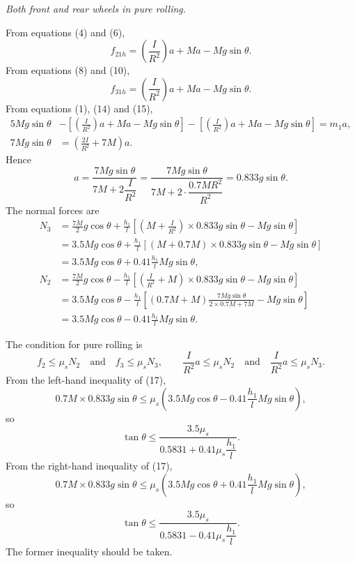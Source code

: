 \emph{Both front and rear wheels in pure rolling.}

From equations (4) and (6),
\begin{equation}
f_{21h}=\left(\frac{I}{R^2}\right)a+Ma-Mg\sin\theta. \tag{14}
\end{equation}
From equations (8) and (10),
\begin{equation}
f_{31h}=\left(\frac{I}{R^2}\right)a+Ma-Mg\sin\theta. \tag{15}
\end{equation}
From equations (1), (14) and (15),
\begin{align*}
5Mg\sin\theta&-\left[\left(\frac{I}{R^2}\right)a+Ma-Mg\sin\theta\right]
-\left[\left(\frac{I}{R^2}\right)a+Ma-Mg\sin\theta\right]=m_1a,\\
7Mg\sin\theta&=\left(\frac{2I}{R^2}+7M\right)a.
\end{align*}
Hence
\begin{equation}
a=\frac{7Mg\sin\theta}{7M+2\dfrac{I}{R^2}}
=\frac{7Mg\sin\theta}{7M+2\cdot\dfrac{0.7MR^2}{R^2}}
=0.833g\sin\theta. \tag{16}
\end{equation}
The normal forces are
\begin{align*}
N_3&=\frac{7M}{2}g\cos\theta+\frac{h_1}{l}\left[\left(M+\frac{I}{R^2}\right)\times0.833g\sin\theta-Mg\sin\theta\right]\\
&=3.5Mg\cos\theta+\frac{h_1}{l}\left[(M+0.7M)\times0.833g\sin\theta-Mg\sin\theta\right]\\
&=3.5Mg\cos\theta+0.41\frac{h_1}{l}Mg\sin\theta,\\[4pt]
N_2&=\frac{7M}{2}g\cos\theta-\frac{h_1}{l}\left[\left(\frac{I}{R^2}+M\right)\times0.833g\sin\theta-Mg\sin\theta\right]\\
&=3.5Mg\cos\theta-\frac{h_1}{l}\left[(0.7M+M)\frac{7Mg\sin\theta}{2\times0.7M+7M}-Mg\sin\theta\right]\\
&=3.5Mg\cos\theta-0.41\frac{h_1}{l}Mg\sin\theta.
\end{align*}

The condition for pure rolling is
\begin{equation}
f_2\le\mu_sN_2\quad\text{and}\quad f_3\le\mu_sN_3,
\qquad
\frac{I}{R^2}a\le\mu_sN_2\quad\text{and}\quad\frac{I}{R^2}a\le\mu_sN_3. \tag{17}
\end{equation}
From the left-hand inequality of (17),
\[
0.7M\times0.833g\sin\theta\le\mu_s\left(3.5Mg\cos\theta-0.41\frac{h_1}{l}Mg\sin\theta\right),
\]
so
\[
\tan\theta\le\frac{3.5\mu_s}{0.5831+0.41\mu_s\dfrac{h_1}{l}}.
\]
From the right-hand inequality of (17),
\[
0.7M\times0.833g\sin\theta\le\mu_s\left(3.5Mg\cos\theta+0.41\frac{h_1}{l}Mg\sin\theta\right),
\]
so
\[
\tan\theta\le\frac{3.5\mu_s}{0.5831-0.41\mu_s\dfrac{h_1}{l}}.
\]
The former inequality should be taken.

